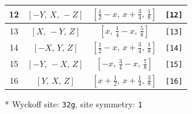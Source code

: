 \documentclass[fleqn,8pt]{jsarticle}
\begin{document}
\begin{longtable}{cccc}
12 & $\left[ - Y,\, X,\, - Z \right]$ & $\left[ \frac{1}{2} - x,\, x + \frac{3}{4},\, \frac{1}{8} \right]$ & {\tt [12]} \\ \hline
13 & $\left[ X,\, - Y,\, Z \right]$ & $\left[ x,\, \frac{1}{4} - x,\, \frac{5}{8} \right]$ & {\tt [13]} \\ \hline
14 & $\left[ - X,\, Y,\, Z \right]$ & $\left[ \frac{1}{2} - x,\, x + \frac{3}{4},\, \frac{1}{8} \right]$ & {\tt [14]} \\ \hline
15 & $\left[ - Y,\, - X,\, Z \right]$ & $\left[ - x,\, \frac{3}{4} - x,\, \frac{7}{8} \right]$ & {\tt [15]} \\ \hline
16 & $\left[ Y,\, X,\, Z \right]$ & $\left[ x + \frac{1}{2},\, x + \frac{1}{4},\, \frac{3}{8} \right]$ & {\tt [16]} \\
\end{longtable}
* Wyckoff site: {\tt 32g}, site symmetry: {\tt 1}
\renewcommand{\arraystretch}{1.2}
\end{document}
